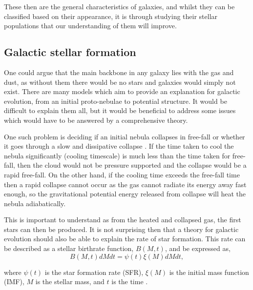 \documentclass[12pt, twocolumn]{revtex4}    %
\begin{document}
These then are the general characteristics of galaxies, and whilst they can be classified based on their appearance, it is through studying their stellar populations that our understanding of them will improve. 


\subsection{Galactic stellar formation}


One could argue that the main backbone in any galaxy lies with the gas and dust, as without them there would be no stars and galaxies would simply not exist. There are many models which aim to provide an explanation for galactic evolution, from an initial proto-nebulae to potential structure. It would be difficult to explain them all, but it would be beneficial to address some issues which would have to be answered by a comprehensive theory. 

One such problem is deciding if an initial nebula collapses in free-fall or whether it goes through a slow and dissipative collapse \cite{carroll_astro}. If the time taken to cool the nebula significantly (cooling timescale) is much less than the time taken for free-fall, then the cloud would not be pressure supported and the collapse would be a rapid free-fall. On the other hand, if the cooling time exceeds the free-fall time then a rapid collapse cannot occur as the gas cannot radiate its energy away fast enough, so the gravitational potential energy released from collapse will heat the nebula adiabatically. 

This is important to understand as from the heated and collapsed gas, the first stars can then be produced. It is not surprising then that a theory for galactic evolution should also be able to explain the rate of star formation. This rate can be described as a stellar birthrate function, $B(M,t)$, and be expressed as,
\begin{equation}
B(M,t)dM dt = \psi (t) \xi (M) dM dt, 
\label{eqn:stellar_birth_rate}
\end{equation}

where $\psi(t)$ is the star formation rate (SFR), $\xi (M)$ is the initial mass function (IMF), $M$ is the stellar mass, and $t$ is the time \cite{carroll_astro}. 
\end{document}
